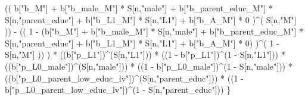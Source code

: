 \documentclass[
]{book}
\newenvironment{Shaded}{\begin{snugshade}}{\end{snugshade}}
\newcommand{\DecValTok}[1]{\textcolor[rgb]{0.00,0.00,0.81}{#1}}
\newcommand{\NormalTok}[1]{#1}
\newcommand{\SpecialCharTok}[1]{\textcolor[rgb]{0.00,0.00,0.00}{#1}}
\newcommand{\StringTok}[1]{\textcolor[rgb]{0.31,0.60,0.02}{#1}}
\begin{document}
\begin{Shaded}
\begin{Highlighting}[]
\NormalTok{          (( b[}\StringTok{"b\_M"}\NormalTok{] }\SpecialCharTok{+} 
\NormalTok{               b[}\StringTok{"b\_male\_M"}\NormalTok{] }\SpecialCharTok{*}\NormalTok{ S[n,}\StringTok{"male"}\NormalTok{] }\SpecialCharTok{+} 
\NormalTok{               b[}\StringTok{"b\_parent\_educ\_M"}\NormalTok{] }\SpecialCharTok{*}\NormalTok{ S[n,}\StringTok{"parent\_educ"}\NormalTok{] }\SpecialCharTok{+} 
\NormalTok{               b[}\StringTok{"b\_L1\_M"}\NormalTok{] }\SpecialCharTok{*}\NormalTok{ S[n,}\StringTok{"L1"}\NormalTok{] }\SpecialCharTok{+}
\NormalTok{               b[}\StringTok{"b\_A\_M"}\NormalTok{] }\SpecialCharTok{*} \DecValTok{0}\NormalTok{ )}\SpecialCharTok{\^{}}\NormalTok{( S[n,}\StringTok{"M"}\NormalTok{] )) }\SpecialCharTok{{-}} 
\NormalTok{          (( }\DecValTok{1} \SpecialCharTok{{-}}\NormalTok{ (b[}\StringTok{"b\_M"}\NormalTok{] }\SpecialCharTok{+} 
\NormalTok{                    b[}\StringTok{"b\_male\_M"}\NormalTok{] }\SpecialCharTok{*}\NormalTok{ S[n,}\StringTok{"male"}\NormalTok{] }\SpecialCharTok{+} 
\NormalTok{                    b[}\StringTok{"b\_parent\_educ\_M"}\NormalTok{] }\SpecialCharTok{*}\NormalTok{ S[n,}\StringTok{"parent\_educ"}\NormalTok{] }\SpecialCharTok{+} 
\NormalTok{                    b[}\StringTok{"b\_L1\_M"}\NormalTok{] }\SpecialCharTok{*}\NormalTok{ S[n,}\StringTok{"L1"}\NormalTok{] }\SpecialCharTok{+}
\NormalTok{                    b[}\StringTok{"b\_A\_M"}\NormalTok{] }\SpecialCharTok{*} \DecValTok{0}\NormalTok{) )}\SpecialCharTok{\^{}}\NormalTok{( }\DecValTok{1} \SpecialCharTok{{-}}\NormalTok{ S[n,}\StringTok{"M"}\NormalTok{] )) ) }\SpecialCharTok{*}
\NormalTok{      ((b[}\StringTok{"p\_L1"}\NormalTok{])}\SpecialCharTok{\^{}}\NormalTok{(S[n,}\StringTok{"L1"}\NormalTok{])) }\SpecialCharTok{*}
\NormalTok{      ((}\DecValTok{1} \SpecialCharTok{{-}}\NormalTok{ b[}\StringTok{"p\_L1"}\NormalTok{])}\SpecialCharTok{\^{}}\NormalTok{(}\DecValTok{1} \SpecialCharTok{{-}}\NormalTok{ S[n,}\StringTok{"L1"}\NormalTok{])) }\SpecialCharTok{*}
\NormalTok{      ((b[}\StringTok{"p\_L0\_male"}\NormalTok{])}\SpecialCharTok{\^{}}\NormalTok{(S[n,}\StringTok{"male"}\NormalTok{])) }\SpecialCharTok{*} 
\NormalTok{      ((}\DecValTok{1} \SpecialCharTok{{-}}\NormalTok{ b[}\StringTok{"p\_L0\_male"}\NormalTok{])}\SpecialCharTok{\^{}}\NormalTok{(}\DecValTok{1} \SpecialCharTok{{-}}\NormalTok{ S[n,}\StringTok{"male"}\NormalTok{])) }\SpecialCharTok{*} 
\NormalTok{      ((b[}\StringTok{"p\_L0\_parent\_low\_educ\_lv"}\NormalTok{])}\SpecialCharTok{\^{}}\NormalTok{(S[n,}\StringTok{"parent\_educ"}\NormalTok{])) }\SpecialCharTok{*}
\NormalTok{      ((}\DecValTok{1} \SpecialCharTok{{-}}\NormalTok{ b[}\StringTok{"p\_L0\_parent\_low\_educ\_lv"}\NormalTok{])}\SpecialCharTok{\^{}}\NormalTok{(}\DecValTok{1} \SpecialCharTok{{-}}\NormalTok{ S[n,}\StringTok{"parent\_educ"}\NormalTok{])) }
\NormalTok{    \}}
  

\end{Highlighting}
\end{Shaded}
\end{document}
